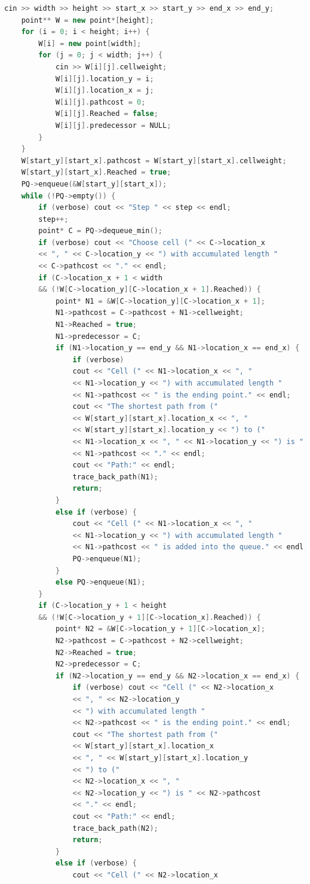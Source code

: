 \documentclass[a4paper]{article}
\begin{document}
\begin{lstlisting}[language=C++]
	cin >> width >> height >> start_x >> start_y >> end_x >> end_y;
	point** W = new point*[height];
	for (i = 0; i < height; i++) {
		W[i] = new point[width];
		for (j = 0; j < width; j++) {
			cin >> W[i][j].cellweight;
			W[i][j].location_y = i;
			W[i][j].location_x = j;
			W[i][j].pathcost = 0;
			W[i][j].Reached = false;
			W[i][j].predecessor = NULL;
		}
	}
	W[start_y][start_x].pathcost = W[start_y][start_x].cellweight;
	W[start_y][start_x].Reached = true;
	PQ->enqueue(&W[start_y][start_x]);
	while (!PQ->empty()) {
		if (verbose) cout << "Step " << step << endl;
		step++;
		point* C = PQ->dequeue_min();
		if (verbose) cout << "Choose cell (" << C->location_x 
		<< ", " << C->location_y << ") with accumulated length " 
		<< C->pathcost << "." << endl;
		if (C->location_x + 1 < width 
		&& (!W[C->location_y][C->location_x + 1].Reached)) {
			point* N1 = &W[C->location_y][C->location_x + 1];
			N1->pathcost = C->pathcost + N1->cellweight;
			N1->Reached = true;
			N1->predecessor = C;
			if (N1->location_y == end_y && N1->location_x == end_x) {
				if (verbose) 
				cout << "Cell (" << N1->location_x << ", " 
				<< N1->location_y << ") with accumulated length " 
				<< N1->pathcost << " is the ending point." << endl;
				cout << "The shortest path from (" 
				<< W[start_y][start_x].location_x << ", " 
				<< W[start_y][start_x].location_y << ") to (" 
				<< N1->location_x << ", " << N1->location_y << ") is " 
				<< N1->pathcost << "." << endl;
				cout << "Path:" << endl;
				trace_back_path(N1);
				return;
			}
			else if (verbose) {
				cout << "Cell (" << N1->location_x << ", " 
				<< N1->location_y << ") with accumulated length " 
				<< N1->pathcost << " is added into the queue." << endl;
				PQ->enqueue(N1);
			}
			else PQ->enqueue(N1);
		}
		if (C->location_y + 1 < height 
		&& (!W[C->location_y + 1][C->location_x].Reached)) {
			point* N2 = &W[C->location_y + 1][C->location_x];
			N2->pathcost = C->pathcost + N2->cellweight;
			N2->Reached = true;
			N2->predecessor = C;
			if (N2->location_y == end_y && N2->location_x == end_x) {
				if (verbose) cout << "Cell (" << N2->location_x 
				<< ", " << N2->location_y 
				<< ") with accumulated length " 
				<< N2->pathcost << " is the ending point." << endl;
				cout << "The shortest path from (" 
				<< W[start_y][start_x].location_x 
				<< ", " << W[start_y][start_x].location_y 
				<< ") to (" 
				<< N2->location_x << ", " 
				<< N2->location_y << ") is " << N2->pathcost 
				<< "." << endl;
				cout << "Path:" << endl;
				trace_back_path(N2);
				return;
			}
			else if (verbose) {
				cout << "Cell (" << N2->location_x 

\end{lstlisting}
\end{document}
